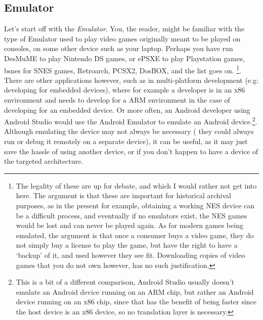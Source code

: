 \documentclass[twocolumn, a4paper,12pt]{article}
\begin{document}
\subsection{Emulator}
Let's start off with the \textit{Emulator}. 
You, the reader,
might be familiar with the type of Emulator used to play video games originally meant to be played on consoles, on some other device
such as your laptop. Perhaps you have run DesMuME to play Nintendo DS games, or ePSXE to play Playstation games, bsnes for SNES games,
Retroarch, PCSX2, DosBOX, and the list goes on.
\footnote{The legality of these are up for debate, and which I would rather not get into here. The argument is that
these are important for historical archival purposes, as in the present for example, obtaining a working NES device can be a
difficult process, and eventually if no emulators exist, the NES games would be lost and can never be played again. As for
modern games being emulated, the argument is that once a consumer buys a video game, they do not simply buy a license to play the game,
but have the right to have a `backup' of it, and used however they see fit. Downloading copies of video games that you do not own
however, has no such justification.}. There are other applications however, such as in multi-platform development (e.g: developing
for embedded devices), where for example a developer is in an x86 environment and needs to develop for a ARM environment in the case of
developing for an embedded device. Or more often, an Android developer using Android Studio would use the Android Emulator to
emulate an Android device.\footnote{This is a bit of a different comparison, Android Studio usually doesn't emulate an Android device
running on an ARM chip, but rather an Android device running on an x86 chip, since that has the benefit of being faster since the host
device is an x86 device, so no translation layer is necessary.}. Although emulating the device may not always be necessary (
they could always run or debug it remotely on a separate device), it can be useful, as it may just save the hassle of using
another device, or if you don't happen to have a device of the targeted architecture.
\end{document}
